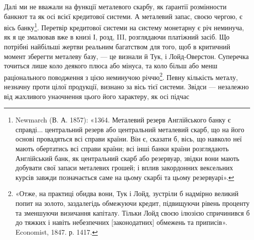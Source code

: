 Далі ми не вважали на функції металевого скарбу, як ґарантії розмінности
банкнот та як осі всієї кредитової системи. А металевий запас, своєю чергою,
є вісь банку\footnote{
Newmarch (В. А. 1857): «1364. Металевий резерв Англійського банку є справді... центральний
резерв або центральний металевий скарб, що на його основі провадяться всі справи країни.
Він є, сказати б, вісь, що навколо неї мають обертатись всі справи країни; всі інші банки країни
розглядають Англійський банк, як центральний скарб або резервуар, звідки вони мають добувати свої
запаси металевих грошей; і вплив закордонних вексельних курсів завжди позначається саме на цьому
скарбі та цьому резервуарі».
}. Перетвір кредитової системи на систему монетарну є річ неминуча,
як я це змалював вже в книзі І, розд, III, розглядаючи платіжний
засіб. Що потрібні найбільші жертви реальним багатством для того, щоб в критичний
момент зберегти металеву базу, — це визнали й Тук, і Лойд-Оверстон.
Суперечка точиться лише коло деякого плюса або мінуса, та коло більш або
менш раціонального поводження з цією неминучою річчю\footnote{
«Отже, на практиці обидва вони, Тук і Лойд, зустріли б надмірно великий попит на золото,
заздалегідь обмежуючи кредит, підвищуючи рівень проценту та зменшуючи визичання капіталу. Тільки
Лойд своєю ілюзією спричинився б до тяжких і навіть небезпечних [законодатних] обмежень та
приписів».
Economist, 1847. р. 1417.
}. Певну кількість
металу, незначну проти цілої продукції, визнано за вісь тієї системи. Звідси —
незалежно від жахливого унаочнення цього його характеру, як осі підчас